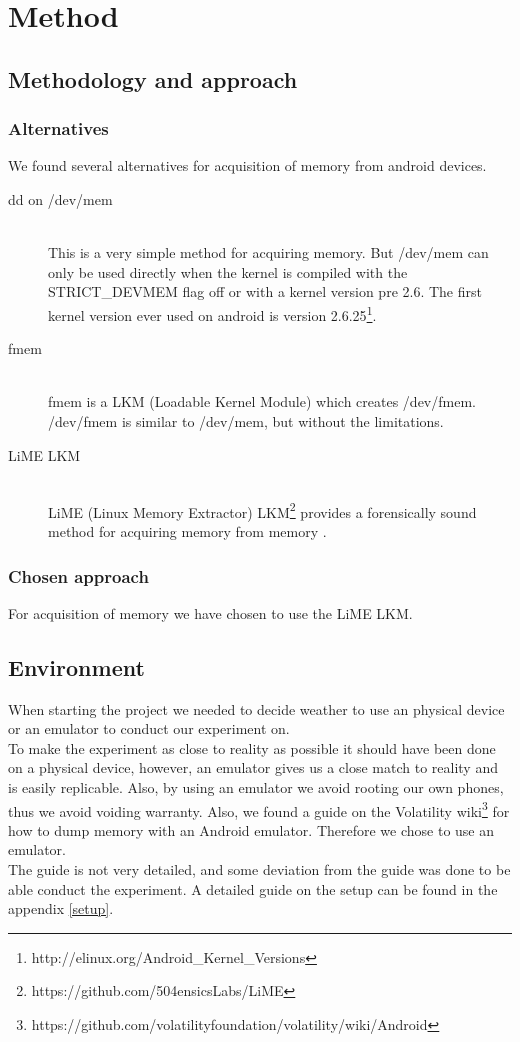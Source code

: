 \section{Method}
\subsection{Methodology and approach}
  \subsubsection{Alternatives}
  We found several alternatives for acquisition of memory from android devices.
  \begin{description}
    \item[dd on /dev/mem] \hfill \\
      This is a very simple method for acquiring memory. But /dev/mem can only be used directly when the kernel is 
      compiled with the STRICT\_DEVMEM flag off or with a kernel version pre 2.6. The first kernel version ever used on 
      android is version 2.6.25\footnote{http://elinux.org/Android\_Kernel\_Versions}.
    \item[fmem] \hfill \\
      fmem is a LKM (Loadable Kernel Module) which creates /dev/fmem. /dev/fmem is similar to /dev/mem, but without the limitations.
    \item[LiME LKM] \hfill \\
      LiME (Linux Memory Extractor) LKM\footnote{https://github.com/504ensicsLabs/LiME} provides a forensically sound method for acquiring memory from 
      memory \cite{heriyanto2013procedures}.
  \end{description}
  \subsubsection{Chosen approach}
  For acquisition of memory we have chosen to use the LiME LKM.
\subsection{Environment}
When starting the project we needed to decide weather to use an physical device or an emulator
to conduct our experiment on.\\
To make the experiment as close to reality as possible it should have been done on a physical device, 
however, an emulator gives us a close match to reality and is easily replicable. Also, by using an emulator 
we avoid rooting our own phones, thus we avoid voiding warranty. Also, we found a guide on the Volatility 
wiki\footnote{https://github.com/volatilityfoundation/volatility/wiki/Android} for how to dump memory with 
an Android emulator. Therefore we chose to use an emulator.\\
The guide is not very detailed, and some deviation from the guide was done to be able conduct the experiment. 
A detailed guide on the setup can be found in the appendix \ref{setup}.\\

